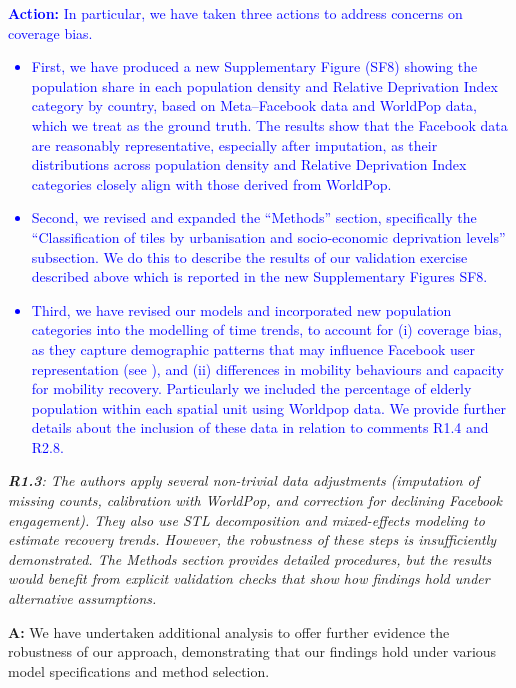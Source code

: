 \documentclass[12pt,a4paper,oneside, reqno]{amsart}
\begin{document}
\textcolor{blue}{\textbf{Action:} In particular, we have taken three actions to address concerns on coverage bias. 
\begin{itemize}[noitemsep, topsep=0pt]
    \item First, we have produced a new Supplementary Figure (SF8) showing the population share in each population density and Relative Deprivation Index category by country, based on Meta–Facebook data and WorldPop data, which we treat as the ground truth. The results show that the Facebook data are reasonably representative, especially after imputation, as their distributions across population density and Relative Deprivation Index categories closely align with those derived from WorldPop.
    \item Second, we revised and expanded the ``Methods'' section, specifically the ``Classification of tiles by urbanisation and socio-economic deprivation levels'' subsection. We do this to describe the results of our validation exercise described above which is reported in the new Supplementary Figures SF8. 
    \item Third, we have revised our models and incorporated new population categories into the modelling of time trends, to account for (i) coverage bias, as they capture demographic patterns that may influence Facebook user representation (see \parencite{cabrera2025bias}), and (ii) differences in mobility behaviours and capacity for mobility recovery. Particularly we included the percentage of elderly population within each spatial unit using Worldpop data. We provide further details about the inclusion of these data in relation to comments R1.4 and R2.8.
\end{itemize}}

\setlength{\leftskip}{0cm} \textit{\textbf{R1.3}: The authors apply several non-trivial data adjustments (imputation of missing counts, calibration with WorldPop, and correction for declining Facebook engagement). They also use STL decomposition and mixed-effects modeling to estimate recovery trends. However, the robustness of these steps is insufficiently demonstrated. The Methods section provides detailed procedures, but the results would benefit from explicit validation checks that show how findings hold under alternative assumptions.}

\setlength{\leftskip}{1cm}\textbf{A:} We have undertaken additional analysis to offer further evidence the robustness of our approach, demonstrating that our findings hold under various model specifications and method selection.
\end{document}
